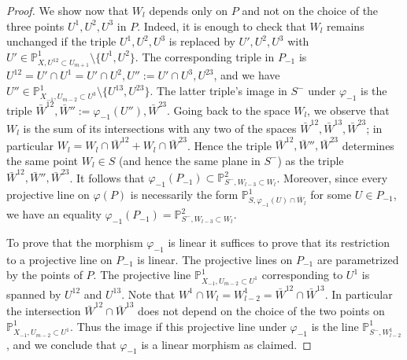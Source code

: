 \documentclass[12pt]{amsart}
\def\PP {{\mathbb P}}     %
\begin{document}
\begin{proof}
We show now that $W_l$ depends only on $P$ and not on the choice of the three points $U^1,U^2,U^3$ in $P$. Indeed, it is enough to check that $W_l$ remains unchanged if the triple $U^1,U^2,U^3$ is replaced by $U',U^2,U^3$ with $U'\in\PP^1_{X,U^{12}\subset U_{m+1}}\setminus\{U^1,U^2\}$. The corresponding triple in $P_{-1}$ is $U^{12}=U'\cap U^1=U'\cap U^2, U'':=U'\cap U^3, U^{23}$, and we have $U''\in\PP^1_{X_{-1},U_{m-2}\subset U^3}\setminus\{U^{13},U^{23}\}$. The latter triple's image in $S^{-}$ under $\varphi_{-1}$ is the triple $\bar W^{12},\bar W'':=\varphi_{-1}(U''),\bar W^{23}$. Going back to the space $W_l$, we observe that $W_l$ is the sum of its intersections with any two of the spaces $\bar W^{12},\bar W^{13},\bar W^{23}$; in particular $W_l=W_l\cap \bar W^{12} + W_l\cap \bar W^{23}$. Hence the triple $\bar W^{12},\bar W'',\bar W^{23}$ determines the same point $W_l\in S$ (and hence the same plane in $S^{-}$) as the triple $\bar W^{12},\bar W'',\bar W^{23}$. It follows that $\varphi_{-1}(P_{-1})\subset\PP^{2}_{S^{-},W_{l-3}\subset W_l}$. Moreover, since every projective line on $\varphi(P)$ is necessarily the form $\PP^1_{S,\varphi_{-1}(U)\cap \bar W_l}$ for some $U\in P_{-1}$, we have an equality $\varphi_{-1}(P_{-1})=\PP^{2}_{S^{-},W_{l-3}\subset W_l}$.

To prove that the morphism $\varphi_{-1}$ is linear it suffices to prove that its restriction to a projective line on $P_{-1}$ is linear. The projective lines on $P_{-1}$ are parametrized by the points of $P$. The projective line $\PP^1_{X_{-1},U_{m-2}\subset U^1}$ corresponding to $U^1$ is spanned by $U^{12}$ and $U^{13}$. Note that $W^1\cap W_l=W^1_{l-2}=\bar W^{12}\cap\bar W^{13}$. In particular the intersection $\bar W^{12}\cap\bar W^{13}$ does not depend on the choice of the two points on $\PP^1_{X_{-1},U_{m-2}\subset U^1}$. Thus the image if this projective line under $\varphi_{-1}$ is the line $\PP^1_{S^{-}, W^1_{l-2}}$, and we conclude that $\varphi_{-1}$ is a linear morphism as claimed.



\end{proof}
\end{document}
